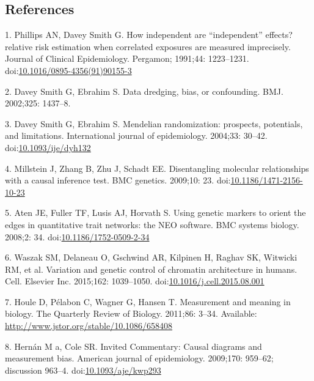 \documentclass[]{article}
\begin{document}
\newpage

\hypertarget{references}{%
\subsection{References}\label{references}}

\raggedright

\hypertarget{refs}{}
\leavevmode\hypertarget{ref-Phillips1991}{}%
1. Phillips AN, Davey Smith G. How independent are ``independent''
effects? relative risk estimation when correlated exposures are measured
imprecisely. Journal of Clinical Epidemiology. Pergamon; 1991;44:
1223--1231.
doi:\href{https://doi.org/10.1016/0895-4356(91)90155-3}{10.1016/0895-4356(91)90155-3}

\leavevmode\hypertarget{ref-DaveySmith2002}{}%
2. Davey Smith G, Ebrahim S. Data dredging, bias, or confounding. BMJ.
2002;325: 1437--8.

\leavevmode\hypertarget{ref-DaveySmith2004}{}%
3. Davey Smith G, Ebrahim S. Mendelian randomization: prospects,
potentials, and limitations. International journal of epidemiology.
2004;33: 30--42.
doi:\href{https://doi.org/10.1093/ije/dyh132}{10.1093/ije/dyh132}

\leavevmode\hypertarget{ref-Millstein2009}{}%
4. Millstein J, Zhang B, Zhu J, Schadt EE. Disentangling molecular
relationships with a causal inference test. BMC genetics. 2009;10: 23.
doi:\href{https://doi.org/10.1186/1471-2156-10-23}{10.1186/1471-2156-10-23}

\leavevmode\hypertarget{ref-Aten2008}{}%
5. Aten JE, Fuller TF, Lusis AJ, Horvath S. Using genetic markers to
orient the edges in quantitative trait networks: the NEO software. BMC
systems biology. 2008;2: 34.
doi:\href{https://doi.org/10.1186/1752-0509-2-34}{10.1186/1752-0509-2-34}

\leavevmode\hypertarget{ref-Waszak2015}{}%
6. Waszak SM, Delaneau O, Gschwind AR, Kilpinen H, Raghav SK, Witwicki
RM, et al. Variation and genetic control of chromatin architecture in
humans. Cell. Elsevier Inc. 2015;162: 1039--1050.
doi:\href{https://doi.org/10.1016/j.cell.2015.08.001}{10.1016/j.cell.2015.08.001}

\leavevmode\hypertarget{ref-Houle2011}{}%
7. Houle D, Pélabon C, Wagner G, Hansen T. Measurement and meaning in
biology. The Quarterly Review of Biology. 2011;86: 3--34. Available:
\url{http://www.jstor.org/stable/10.1086/658408}

\leavevmode\hypertarget{ref-Hernan2009}{}%
8. Hernán M a, Cole SR. Invited Commentary: Causal diagrams and
measurement bias. American journal of epidemiology. 2009;170: 959--62;
discussion 963--4.
doi:\href{https://doi.org/10.1093/aje/kwp293}{10.1093/aje/kwp293}
\end{document}
